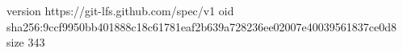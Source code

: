 version https://git-lfs.github.com/spec/v1
oid sha256:9ccf9950bb401888c18c61781eaf2b639a728236ee02007e40039561837ce0d8
size 343
